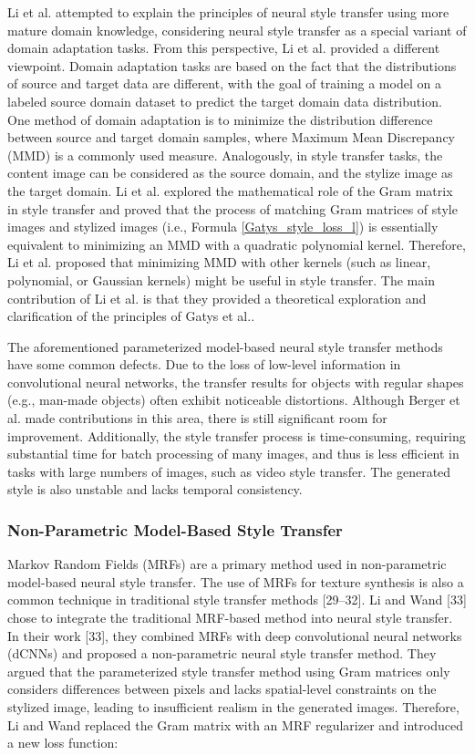 Li et al.\citep{28li2017demystifying} attempted to explain the principles of neural style transfer using more mature domain knowledge, considering neural style transfer as a special variant of domain adaptation tasks. From this perspective, Li et al. provided a different viewpoint. Domain adaptation tasks are based on the fact that the distributions of source and target data are different, with the goal of training a model on a labeled source domain dataset to predict the target domain data distribution. One method of domain adaptation is to minimize the distribution difference between source and target domain samples, where Maximum Mean Discrepancy (MMD) is a commonly used measure. Analogously, in style transfer tasks, the content image can be considered as the source domain, and the stylize image as the target domain. Li et al. explored the mathematical role of the Gram matrix in style transfer and proved that the process of matching Gram matrices of style images and stylized images (i.e., Formula \ref{Gatys_style_loss_l}) is essentially equivalent to minimizing an MMD with a quadratic polynomial kernel. Therefore, Li et al. proposed that minimizing MMD with other kernels (such as linear, polynomial, or Gaussian kernels) might be useful in style transfer. The main contribution of Li et al. is that they provided a theoretical exploration and clarification of the principles of Gatys et al.\citep{02gatys2016image}.

The aforementioned parameterized model-based neural style transfer methods have some common defects. Due to the loss of low-level information in convolutional neural networks, the transfer results for objects with regular shapes (e.g., man-made objects) often exhibit noticeable distortions. Although Berger et al.\citep{26berger2016incorporating} made contributions in this area, there is still significant room for improvement. Additionally, the style transfer process is time-consuming, requiring substantial time for batch processing of many images, and thus is less efficient in tasks with large numbers of images, such as video style transfer. The generated style is also unstable and lacks temporal consistency.

\subsubsection{Non-Parametric Model-Based Style Transfer}

Markov Random Fields (MRFs) are a primary method used in non-parametric model-based neural style transfer. The use of MRFs for texture synthesis is also a common technique in traditional style transfer methods [29–32]. Li and Wand [33] chose to integrate the traditional MRF-based method into neural style transfer. In their work [33], they combined MRFs with deep convolutional neural networks (dCNNs) and proposed a non-parametric neural style transfer method. They argued that the parameterized style transfer method using Gram matrices only considers differences between pixels and lacks spatial-level constraints on the stylized image, leading to insufficient realism in the generated images. Therefore, Li and Wand replaced the Gram matrix with an MRF regularizer and introduced a new loss function:

